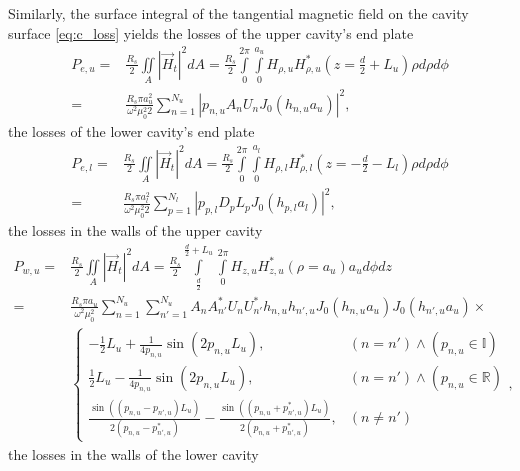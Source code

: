 Similarly, the surface integral of the tangential magnetic field on the cavity surface \eqref{eq:c_loss} yields the losses of the upper cavity's end plate
\begin{align}
P_{e,u}=&\frac{R_s}{2}\iint\limits_{\mathit{A}}|\vec{H}_{t}|^2\mathit{dA}=\frac{R_s}{2}\int\limits_0^{2\pi}\int\limits_0^{a_u}H_{\rho,u}H_{\rho,u}^*\left(z=\frac{d}{2}+L_u\right) \rho\mathit{d\rho d\phi}\\ =& \frac{R_s\pi a_u^2}{\omega^2 \mu_0^2 2}\sum\limits_{n=1}^{N_u}|p_{n,u}A_nU_nJ_0(h_{n,u}a_u)|^2\text{,}\label{eq:p_eu}
\end{align}
the losses of the lower cavity's end plate
\begin{align}
P_{e,l}=&\frac{R_s}{2}\iint\limits_{\mathit{A}}|\vec{H}_{t}|^2\mathit{dA}=\frac{R_s}{2}\int\limits_0^{2\pi}\int\limits_0^{a_l}H_{\rho,l}H_{\rho,l}^*\left(z=-\frac{d}{2}-L_l\right) \rho\mathit{d\rho d\phi}\\ =& \frac{R_s\pi a_l^2}{\omega^2 \mu_0^2 2}\sum\limits_{p=1}^{N_l}|p_{p,l}D_pL_pJ_0(h_{p,l}a_l)|^2\text{,}\label{eq:p_el}
\end{align}
the losses in the walls of the upper cavity
\begin{align}
P_{w,u}=&\frac{R_s}{2}\iint\limits_\mathit{A}|\vec{H}_t|^2\mathit{dA}=\frac{R_s}{2}\int\limits_{\frac{d}{2}}^{\frac{d}{2}+L_u}\int\limits_0^{2\pi}H_{z,u}H_{z,u}^*(\rho=a_u)a_u\mathit{d\phi dz}\\
       =& \frac{R_s\pi a_u}{\omega^2\mu_0^2}\sum\limits_{n=1}^{N_u}\sum\limits_{n'=1}^{N_u}A_nA_{n'}^*U_nU_{n'}^*h_{n,u}h_{n',u}J_0(h_{n,u}a_u)J_0(h_{n',u}a_u)\times\nonumber\\&
       \begin{cases}
        	-\frac{1}{2}L_u+\frac{1}{4p_{n,u}}\sin(2p_{n,u}L_u), &(n=n') \wedge (p_{n,u}\in\mathbb{I})\\
        	 \frac{1}{2}L_u-\frac{1}{4p_{n,u}}\sin(2p_{n,u}L_u), &(n=n')  \wedge  (p_{n,u}\in\mathbb{R})\\
        	 \frac{\sin\left(\left(p_{n,u}-p_{n',u}\right)L_u\right)}{2\left(p_{n,u}-p_{n',u}^*\right)}-\frac{\sin\left(\left(p_{n,u}+p_{n',u}^*\right)L_u\right)}{2\left(p_{n,u}+p_{n',u}^*\right)}, &(n\neq n')
       \end{cases}\text{,}\label{eq:p_wu}
\end{align}
the losses in the walls of the lower cavity
